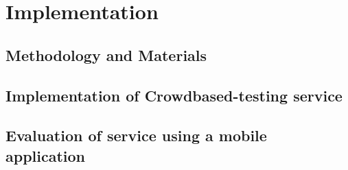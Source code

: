 
\chapter{Implementation}
\section{Methodology and Materials}
\section{ Implementation of Crowdbased-testing service}
\section{Evaluation of service using a mobile application}

\cleardoublepage